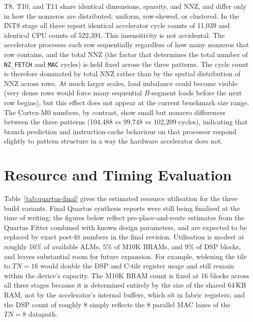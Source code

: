T8, T10, and T11 share identical dimensions, sparsity, and NNZ, and
differ only in how the nonzeros are distributed: uniform, row-skewed, or
clustered. In the INT8 stage all three report identical accelerator
cycle counts of 11,039 and identical CPU counts of 522,391. This
insensitivity is not accidental. The accelerator processes each row
sequentially regardless of how many nonzeros that row contains, and the
total NNZ (the factor that determines the total number of
\texttt{NZ\_FETCH} and \texttt{MAC} cycles) is held fixed across the
three patterns. The cycle count is therefore dominated by total NNZ
rather than by the spatial distribution of NNZ across rows. At much
larger scales, load imbalance could become visible (very dense rows
would force many sequential $B$-segment loads before the next row begins),
but this effect does not appear at the current benchmark size range. The
Cortex-M0 numbers, by contrast, show small but nonzero differences
between the three patterns (104,488 vs 99,748 vs 102,209 cycles),
indicating that branch prediction and instruction-cache behaviour on
that processor respond slightly to pattern structure in a way the
hardware accelerator does not.

\section{Resource and Timing Evaluation}
\label{sec:resources}

Table~\ref{tab:quartus-final} gives the estimated resource utilisation
for the three build variants. Final Quartus synthesis reports were still
being finalised at the time of writing; the figures below reflect
pre-place-and-route estimates from the Quartus Fitter combined with
known design parameters, and are expected to be replaced by exact
post-fit numbers in the final revision. Utilisation is modest at roughly
16\% of available ALMs, 5\% of M10K BRAMs, and 9\% of DSP blocks, and
leaves substantial room for future expansion. For example, widening the
tile to $TN = 16$ would double the DSP and C-tile register usage and
still remain within the device's capacity. The M10K BRAM count is fixed
at 16 blocks across all three stages because it is determined entirely
by the size of the shared 64\,KB RAM, not by the accelerator's internal
buffers, which sit in fabric registers; and the DSP count of roughly 8
simply reflects the 8 parallel MAC lanes of the $TN = 8$ datapath.

